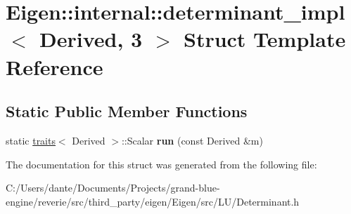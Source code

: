 \hypertarget{struct_eigen_1_1internal_1_1determinant__impl_3_01_derived_00_013_01_4}{}\section{Eigen\+::internal\+::determinant\+\_\+impl$<$ Derived, 3 $>$ Struct Template Reference}
\label{struct_eigen_1_1internal_1_1determinant__impl_3_01_derived_00_013_01_4}
\subsection*{Static Public Member Functions}
\begin{DoxyCompactItemize}
\item 
\mbox{\label{struct_eigen_1_1internal_1_1determinant__impl_3_01_derived_00_013_01_4_ac268a58e38b0278820e9e5f470740cd7}} 
static \mbox{\hyperlink{struct_eigen_1_1internal_1_1traits}{traits}}$<$ Derived $>$\+::Scalar {\bfseries run} (const Derived \&m)
\end{DoxyCompactItemize}


The documentation for this struct was generated from the following file\+:\begin{DoxyCompactItemize}
\item 
C\+:/\+Users/dante/\+Documents/\+Projects/grand-\/blue-\/engine/reverie/src/third\+\_\+party/eigen/\+Eigen/src/\+L\+U/Determinant.\+h\end{DoxyCompactItemize}
